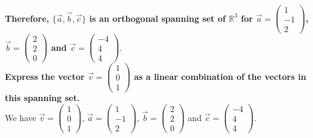 \documentclass[12pt]{book}
\begin{document}
\begin{enumerate}
\textbf{Therefore, $\{\vec{a}, \vec{b}, \vec{c}\}$ is an orthogonal spanning set of $\mathbb{R}^3$ for $\vec{a} = \left(\begin{smallmatrix} 1 \\ -1 \\ 2 \end{smallmatrix}\right)$, $\vec{b} = \left(\begin{smallmatrix} 2 \\ 2 \\ 0 \end{smallmatrix}\right)$ and $\vec{c} = \left(\begin{smallmatrix} -4 \\ 4 \\ 4 \end{smallmatrix}\right)$}. \\

\newpage
\textbf{Express the vector $\vec{v}= \left(\begin{smallmatrix} 1 \\ 0 \\ 1 \end{smallmatrix}\right)$ as a linear combination of the vectors in this spanning set.}\\
We have $\vec{v}= \left(\begin{smallmatrix} 1 \\ 0 \\ 1 \end{smallmatrix}\right)$, $\vec{a} = \left(\begin{smallmatrix} 1 \\ -1 \\ 2 \end{smallmatrix}\right)$, $\vec{b} = \left(\begin{smallmatrix} 2 \\ 2 \\ 0 \end{smallmatrix}\right)$ and $\vec{c} = \left(\begin{smallmatrix} -4 \\ 4 \\ 4 \end{smallmatrix}\right)$.\\


\end{enumerate}
\end{document}
